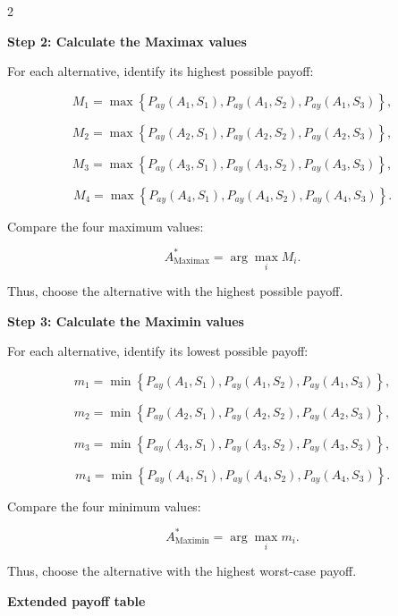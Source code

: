 		\begin{multicols}{2}
		\vspace{0pt}
		
		\textbf{Step 2: Calculate the Maximax values}
		
		For each alternative, identify its highest possible payoff:
		
		\[
		M_1
		=
		\max
		\left\{
		P_{ay}(A_1,S_1),
		P_{ay}(A_1,S_2),
		P_{ay}(A_1,S_3)
		\right\},
		\]
		
		\[
		M_2
		=
		\max
		\left\{
		P_{ay}(A_2,S_1),
		P_{ay}(A_2,S_2),
		P_{ay}(A_2,S_3)
		\right\},
		\]
		
		\[
		M_3
		=
		\max
		\left\{
		P_{ay}(A_3,S_1),
		P_{ay}(A_3,S_2),
		P_{ay}(A_3,S_3)
		\right\},
		\]
		
		\[
		M_4
		=
		\max
		\left\{
		P_{ay}(A_4,S_1),
		P_{ay}(A_4,S_2),
		P_{ay}(A_4,S_3)
		\right\}.
		\]
		
		Compare the four maximum values:
		
		\[
		A^*_{\mathrm{Maximax}}
		=
		\arg\max_i M_i.
		\]
		
		Thus, choose the alternative with the highest possible payoff.
		
		\columnbreak
		
		\textbf{Step 3: Calculate the Maximin values}
		
		For each alternative, identify its lowest possible payoff:
		
		\[
		m_1
		=
		\min
		\left\{
		P_{ay}(A_1,S_1),
		P_{ay}(A_1,S_2),
		P_{ay}(A_1,S_3)
		\right\},
		\]
		
		\[
		m_2
		=
		\min
		\left\{
		P_{ay}(A_2,S_1),
		P_{ay}(A_2,S_2),
		P_{ay}(A_2,S_3)
		\right\},
		\]
		
		\[
		m_3
		=
		\min
		\left\{
		P_{ay}(A_3,S_1),
		P_{ay}(A_3,S_2),
		P_{ay}(A_3,S_3)
		\right\},
		\]
		
		\[
		m_4
		=
		\min
		\left\{
		P_{ay}(A_4,S_1),
		P_{ay}(A_4,S_2),
		P_{ay}(A_4,S_3)
		\right\}.
		\]
		
		Compare the four minimum values:
		
		\[
		A^*_{\mathrm{Maximin}}
		=
		\arg\max_i m_i.
		\]
	
	Thus, choose the alternative with the highest worst-case payoff.
	
	\end{multicols}
	
	\setlength{\columnseprule}{0pt}
	
		\textbf{Extended payoff table}
		
